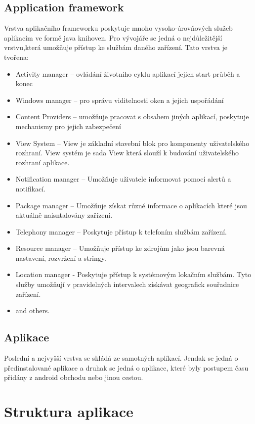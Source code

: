 \subsection{Application framework}
Vrstva aplikačního frameworku poskytuje mnoho vysoko-úrovňových služeb aplikacím ve formě java knihoven. Pro vývojáře se jedná o nejdůležitější vrstvu,která umožňuje přístup ke službám daného zařízení. Tato vrstva je tvořena: 
\begin{itemize} %
\item Activity manager -- ovládání životního cyklu aplikací jejich start průběh a konec
\item Windows manager -- pro správu viditelnosti oken a jejich uspořádání
\item Content Providers -- umožňuje pracovat s obsahem jiných aplikací, poskytuje mechanismy pro jejich zabezpečení 
\item View System -- View je základní stavební blok pro komponenty uživatelského rozhraní. View systém je sada View která slouží k budování uživatelského rozhraní aplikace.
\item Notification manager -- Umožňuje uživatele informovat pomocí alertů a notifikací.
\item Package manager -- Umožňuje získat různé informace o aplikacích které jsou aktuálně naisntalovány  zařízení.
\item Telephony manager -- Poskytuje přístup k telefoním službám zařízení. 
\item Resource manager -- Umožňuje přístup ke zdrojům jako jsou barevná nastavení, rozvržení a stringy.
\item Location manager - Poskytuje přístup k systémovým lokačním službám. Tyto služby umožňují v pravidelných intervalech získávat geografick souřadnice zařízení.
\item and others.
\end{itemize}

\subsection{Aplikace}
Poslední a nejvyšší vrstva se skládá ze samotných aplíkací. Jendak se jedná o předinstalované aplikace a druhak se jedná o aplikace, které byly postupem času přidány z android obchodu nebo jinou cestou.


\section{Struktura aplikace}
